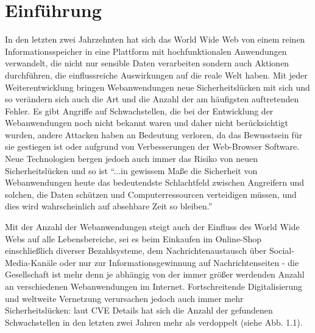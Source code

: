 \documentclass[12pt,oneside,a4paper,parskip]{scrbook}
\begin{document}
\mainmatter

\chapter{Einführung}\label{ch:intro}
In den letzten zwei Jahrzehnten hat sich das World Wide Web von einem reinen Informationsspeicher in eine Plattform mit hochfunktionalen Anwendungen verwandelt, die nicht nur sensible Daten verarbeiten sondern auch  Aktionen durchführen, die einflussreiche Auswirkungen auf die reale Welt haben.
Mit jeder Weiterentwicklung bringen Webanwendungen neue Sicherheitslücken mit sich und so verändern sich auch die Art und die Anzahl der am häufigsten auftretenden Fehler. Es gibt Angriffe auf Schwachstellen, die bei der Entwicklung der Webanwendungen noch nicht bekannt waren und daher nicht berücksichtigt wurden, andere Attacken haben an Bedeutung verloren, da das Bewusstsein für sie gestiegen ist oder aufgrund von Verbesserungen der Web-Browser Software. Neue Technologien bergen jedoch auch immer das Risiko von neuen Sicherheitslücken und so ist ``...in gewissem Maße die Sicherheit von Webanwendungen heute das bedeutendste Schlachtfeld zwischen Angreifern und solchen, die Daten schützen und Computerressourcen verteidigen müssen, und dies wird wahrscheinlich auf absehbare Zeit so bleiben.'' \cite{handbook}

Mit der Anzahl der Webanwendungen steigt auch der Einfluss des World Wide Webs auf alle Lebensbereiche, sei es beim Einkaufen im Online-Shop einschließlich diverser Bezahlsysteme, dem Nachrichtenaustausch über Social-Media-Kanäle oder nur zur Informationsgewinnung auf Nachrichtenseiten - die Gesellschaft ist mehr denn je abhängig von der immer größer werdenden Anzahl an verschiedenen Webanwendungen im Internet.
Fortschreitende Digitalisierung und weltweite Vernetzung verursachen jedoch auch immer mehr Sicherheitslücken: laut CVE Details hat sich die Anzahl der gefundenen Schwachstellen in den letzten zwei Jahren mehr als verdoppelt (siehe Abb. 1.1).
\end{document}
